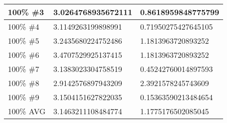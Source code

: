\begin{longtable}{ | X | X | X | }
	100\% \#3 & 3.0264768935672111 & 0.8618959848775799 \\ \hline
	100\% \#4 & 3.1149263199898991 & 0.71950275427645105 \\ \hline
	100\% \#5 & 3.2435680224752486 & 1.1813963720893252 \\ \hline
	100\% \#6 & 3.4707529925137415 & 1.1813963720893252 \\ \hline
	100\% \#7 & 3.1383023304758519 & 0.45242760014897593 \\ \hline
	100\% \#8 & 2.9142576897943209 & 2.3921578245743609 \\ \hline
	100\% \#9 & 3.1504151627822035 & 0.15363590213484654 \\ \hline
	100\% AVG & 3.1463211108484774 & 1.1775176502085045 \\ \hline
\end{longtable}
